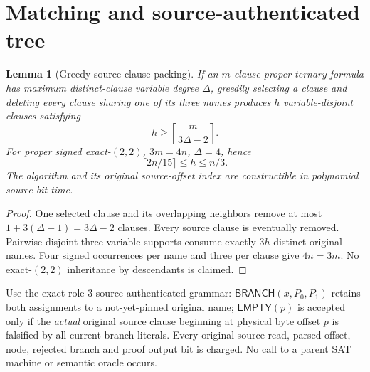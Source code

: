 \documentclass[11pt]{article}
\newtheorem{lemma}[theorem]{Lemma}
\begin{document}
\section{Matching and source-authenticated tree}
\begin{lemma}[Greedy source-clause packing]\label{lem:match}
If an $m$-clause proper ternary formula has maximum distinct-clause variable degree $\Delta$, greedily selecting a clause and deleting every clause sharing one of its three names produces $h$ variable-disjoint clauses satisfying
\[
h\ge\left\lceil\frac{m}{3\Delta-2}\right\rceil.
\]
For proper signed exact-$(2,2)$, $3m=4n$, $\Delta=4$, hence
\[
\boxed{\lceil2n/15\rceil\le h\le n/3.}\tag{1}
\]
The algorithm and its original source-offset index are constructible in polynomial source-bit time.
\end{lemma}
\begin{proof}
One selected clause and its overlapping neighbors remove at most $1+3(\Delta-1)=3\Delta-2$ clauses. Every source clause is eventually removed. Pairwise disjoint three-variable supports consume exactly $3h$ distinct original names. Four signed occurrences per name and three per clause give $4n=3m$. No exact-$(2,2)$ inheritance by descendants is claimed.
\end{proof}

Use the exact role-3 source-authenticated grammar: $\mathsf{BRANCH}(x,P_0,P_1)$ retains both assignments to a not-yet-pinned original name; $\mathsf{EMPTY}(p)$ is accepted only if the \emph{actual} original source clause beginning at physical byte offset $p$ is falsified by all current branch literals. Every original source read, parsed offset, node, rejected branch and proof output bit is charged. No call to a parent SAT machine or semantic oracle occurs.
\end{document}
